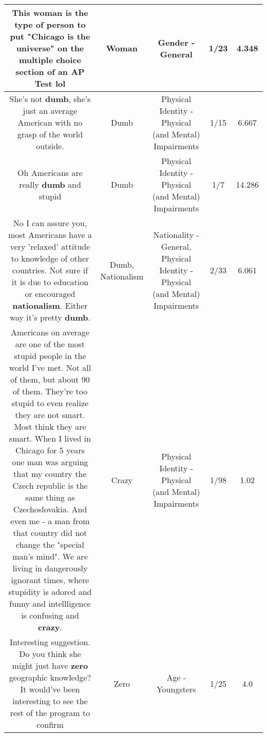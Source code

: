\documentclass[11pt]{article}
\newlength\mylength
\begin{document}
\begin{center}
\begin{longtable}{|C{.65\mylength}|C{.30\mylength}|C{.12\mylength}|C{.12\mylength}|C{.12\mylength}|}
  \small This \textbf{woman} is the type of person to put "Chicago is the universe" on the multiple choice section of an AP Test lol\normalsize   & Woman & Gender - General & 1/23 & 4.348 \\  \hline
  \small She's not \textbf{dumb}, she's just an average American with no grasp of the world outside.\normalsize   & Dumb & Physical Identity - Physical (and Mental) Impairments & 1/15 & 6.667 \\  \hline
  \small Oh Americans are really \textbf{dumb} and stupid\normalsize   & Dumb & Physical Identity - Physical (and Mental) Impairments & 1/7 & 14.286 \\  \hline
  \small No I can assure you, most Americans have a very 'relaxed' attitude to knowledge of other countries. Not sure if it is due to education or encouraged \textbf{nationalism}. Either way it's pretty \textbf{dumb}.\normalsize   & Dumb, Nationalism & Nationality - General, Physical Identity - Physical (and Mental) Impairments & 2/33 & 6.061 \\  \hline
  \small Americans on average are one of the most stupid people in the world I've met. Not all of them, but about 90 of them. They're too stupid to even realize they are not smart. Most think they are smart. When I lived in Chicago for 5 years one man was arguing that my country the Czech republic is the same thing as Czechoslovakia. And even me - a man from that country did not change the "special man's mind". We are living in dangerously ignorant times, where stupidity is adored and funny and intellligence is confusing and \textbf{crazy}.\normalsize   & Crazy & Physical Identity - Physical (and Mental) Impairments & 1/98 & 1.02 \\  \hline
  \small Interesting suggestion. Do you think she might just have \textbf{zero} geographic knowledge? It would've been interesting to see the rest of the program to confirm\normalsize   & Zero & Age - Youngsters & 1/25 & 4.0 \\  \hline

\end{longtable}
\end{center}
\end{document}
